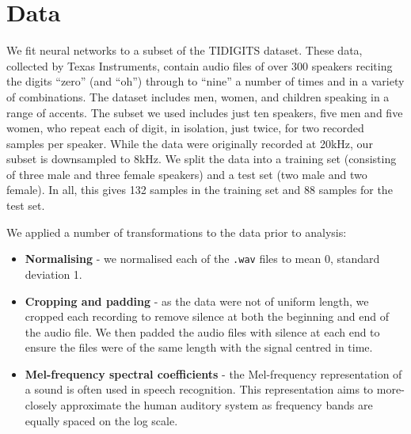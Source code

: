 \section{Data} \label{sec:data}
We fit neural networks to a subset of the TIDIGITS dataset. These data, collected by Texas Instruments, contain audio files of over 300 speakers reciting the digits ``zero'' (and ``oh'') through to ``nine'' a number of times and in a variety of combinations. The dataset includes men, women, and children speaking in a range of accents. The subset we used includes just ten speakers, five men and five women, who repeat each of digit, in isolation, just twice, for two recorded samples per speaker. While the data were originally recorded at 20kHz, our subset is downsampled to 8kHz. We split the data into a training set (consisting of three male and three female speakers) and a test set (two male and two female). In all, this gives 132 samples in the training set and 88 samples for the test set.

 

We applied a number of transformations to the data prior to analysis:
\begin{itemize}
\item \textbf{Normalising} - we normalised each of the \texttt{.wav} files to mean 0, standard deviation 1.

\item \textbf{Cropping and padding} - as the data were not of uniform length, we cropped each recording to remove silence at both the beginning and end of the audio file. We then padded the audio files with silence at each end to ensure the files were of the same length with the signal centred in time.

\item \textbf{Mel-frequency spectral coefficients} - the Mel-frequency representation of a sound is often used in speech recognition. This representation aims to more-closely approximate the human auditory system as frequency bands are equally spaced on the log scale. 

\end{itemize}



